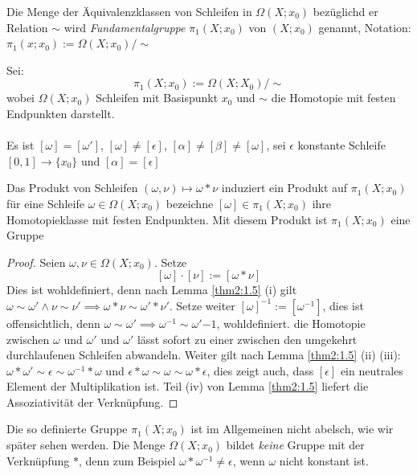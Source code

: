 \documentclass[a4paper,10pt]{scrartcl}
\begin{document}
\begin{df}
 Die Menge der Äquivalenzklassen von Schleifen in $\Omega(X;x_0)$ bezüglichd er Relation $\sim$ wird \emph{Fundamentalgruppe} $\pi_1(X; x_0)$ von $(X;x_0)$ genannt, Notation: $\pi_1(x;x_0):= \Omega(X;x_0)/\sim$
\end{df}
Sei:
\[
 \pi_1(X;x_0):= \Omega(X;X_0)/\sim 
\]
wobei $\Omega(X;x_0)$ Schleifen mit Basispunkt $x_0$ und $\sim$ die Homotopie mit festen Endpunkten darstellt.\\
\fixme[fig56]\\
Es ist $[\omega]=[\omega']$, $[\omega]\neq [\epsilon]$, $[\alpha]\neq [\beta]\neq [\omega]$, sei $\epsilon$ konstante Schleife $[0,1]\to \{x_0\}$ und $[\alpha]=[\epsilon]$
\begin{st}
 Das Produkt von Schleifen $(\omega, \nu) \mapsto \omega * \nu$ induziert ein Produkt auf $\pi_1(X;x_0)$ für 
eine Schleife $\omega \in \Omega(X;x_0)$ bezeichne $[\omega] \in \pi_1(X; x_0)$ ihre Homotopieklasse mit festen Endpunkten. Mit diesem Produkt ist $\pi_1(X;x_0)$ eine Gruppe
\end{st}
\begin{proof}
 Seien $\omega, \nu \in \Omega(X; x_0)$. Setze 
\[
 [\omega] \cdot [\nu]:=[\omega*\nu]
\]
Dies ist wohldefiniert, denn nach Lemma \ref{thm2:1.5} (i) gilt $\omega \sim \omega' \land \nu \sim \nu' \implies \omega * \nu \sim \omega' * \nu'$. Setze weiter $[\omega]^{-1}:=[\omega^{-1}]$, dies ist offensichtlich, denn $\omega \sim \omega' \implies \omega^{-1}\sim \omega'{-1}$, wohldefiniert.
die Homotopie zwischen $\omega$ und $\omega'$ und $\omega'$ lässt sofort zu einer zwischen den umgekehrt durchlaufenen Schleifen abwandeln. Weiter gilt nach Lemma \ref{thm2:1.5} (ii) (iii): $\omega*\omega'\sim \epsilon \sim \omega^{-1}*\omega$ und $\epsilon*\omega\sim \omega \sim \omega*\epsilon$, dies zeigt auch, dass $[\epsilon]$ ein neutrales Element der Multiplikation ist. Teil (iv) von Lemma \ref{thm2:1.5} liefert die Assoziativität der Verknüpfung. 
\end{proof}
Die so definierte Gruppe $\pi_1(X;x_0)$ ist im Allgemeinen nicht abelsch, wie wir später sehen werden. Die Menge $\Omega(X;x_0)$ bildet \emph{keine} Gruppe mit der Verknüpfung $*$, denn zum Beispiel $\omega*\omega^{-1}\neq \epsilon$, wenn $\omega$ nicht konstant ist.
\end{document}
